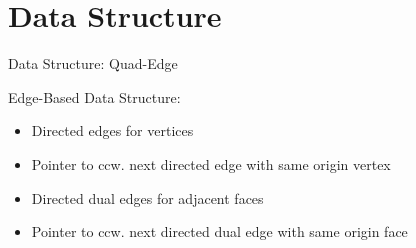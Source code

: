 \documentclass[aspectratio=169]{beamer}
\begin{document}
\section{Data Structure}
  \begin{frame}{Data Structure: Quad-Edge}
    \begin{minipage}[c]{0.49\textwidth}
      Edge-Based Data Structure:
      \onslide<+->
      \begin{itemize}
        \item<+-> Directed edges for vertices
        \item<+-> Pointer to ccw. next directed edge with same origin vertex
        \item<+-> Directed dual edges for adjacent faces
        \item<+-> Pointer to ccw. next directed dual edge with same origin face
      \end{itemize}
    \end{minipage}
    \hfill
    \begin{minipage}[c]{0.49\textwidth}
      \center

\end{minipage}
\end{frame}
\end{document}
